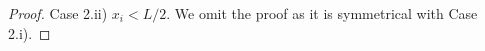 \documentclass[twoside,11pt]{article}
\newcommand{\bd}{\mathbf}
\newcommand{\todo}[1]{}
\renewcommand{\todo}[1]{{\textbf{\color{red} TODO: {#1}}}}
\begin{document}
\begin{proof}
Case 2.ii) $x_i<L/2$. We omit the proof as it is symmetrical with Case 2.i).

%

%
%
%
%
%


\end{proof}
\end{document}
